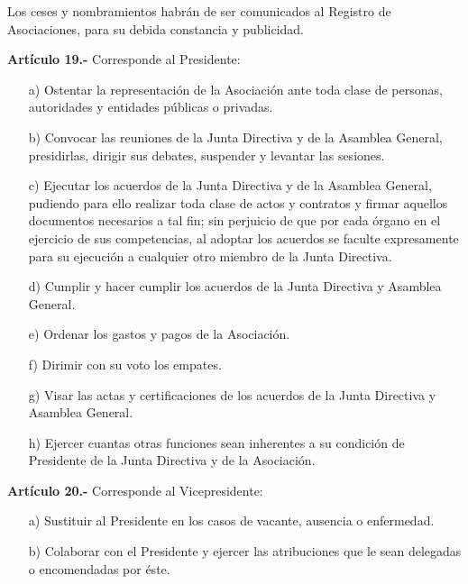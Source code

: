 \documentclass[a4paper,12pt]{article}
\begin{document}
\begin{onehalfspace}
Los ceses y nombramientos habrán de ser comunicados al Registro de Asociaciones, para su debida constancia y publicidad.

\bigskip\bigskip

\textbf{Artículo 19.-} Corresponde al Presidente:
\begin{itemize}
\item [a)] Ostentar la representación de la Asociación ante toda clase de personas, autoridades y entidades públicas o privadas.
\item [b)] Convocar las reuniones de la Junta Directiva y de la Asamblea General, presidirlas, dirigir sus debates, suspender y levantar las sesiones.
\item [c)] Ejecutar los acuerdos de la Junta Directiva y de la Asamblea General, pudiendo para ello realizar toda clase de actos y contratos y firmar aquellos documentos necesarios a tal fin; sin perjuicio de que por cada órgano en el ejercicio de sus competencias, al adoptar los acuerdos se faculte expresamente para su ejecución a cualquier otro miembro de la Junta Directiva.
\item [d)] Cumplir y hacer cumplir los acuerdos de la Junta Directiva y Asamblea General.
\item [e)] Ordenar los gastos y pagos de la Asociación.
\item [f)] Dirimir con su voto los empates.
\item [g)] Visar las actas y certificaciones de los acuerdos de la Junta Directiva y Asamblea General.
\item [h)] Ejercer cuantas otras funciones sean inherentes a su condición de Presidente de la Junta Directiva y de la Asociación.
\end{itemize}

\bigskip\bigskip

\textbf{Artículo 20.-} Corresponde al Vicepresidente:
\begin{itemize}
\item [a)]  Sustituir al Presidente en los casos de vacante, ausencia o enfermedad.
\item [b)]  Colaborar con el Presidente y ejercer las atribuciones que le sean delegadas o encomendadas por éste.
\end{itemize}

\bigskip\bigskip


\end{onehalfspace}
\end{document}
